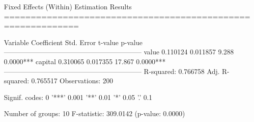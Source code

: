 
Fixed Effects (Within) Estimation Results
============================================================

Variable         Coefficient   Std. Error    t-value    p-value
------------------------------------------------------------
value               0.110124     0.011857      9.288     0.0000***
capital             0.310065     0.017355     17.867     0.0000***
------------------------------------------------------------
R-squared: 0.766758
Adj. R-squared: 0.765517
Observations: 200

Signif. codes: 0 '***' 0.001 '**' 0.01 '*' 0.05 '.' 0.1


Number of groups: 10
F-statistic: 309.0142 (p-value: 0.0000)

